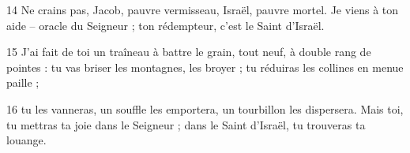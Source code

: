 
14 Ne crains pas, Jacob, pauvre vermisseau, Israël, pauvre mortel. Je viens à ton aide – oracle du Seigneur ; ton rédempteur, c’est le Saint d’Israël.

15 J’ai fait de toi un traîneau à battre le grain, tout neuf, à double rang de pointes : tu vas briser les montagnes, les broyer ; tu réduiras les collines en menue paille ;

16 tu les vanneras, un souffle les emportera, un tourbillon les dispersera. Mais toi, tu mettras ta joie dans le Seigneur ; dans le Saint d’Israël, tu trouveras ta louange.